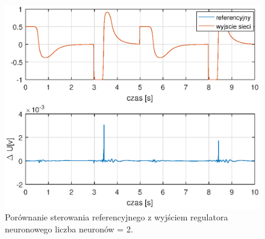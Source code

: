 \begin{figure}[h!]
	\centering
	\includegraphics[scale = 0.8]{fig/20neuronU.eps}
	\caption		
	{Porównanie sterowania referencyjnego z wyjściem regulatora neuronowego liczba neuronów = 2.}
	\label{20nU}
\end{figure}

\FloatBarrier
\newpage